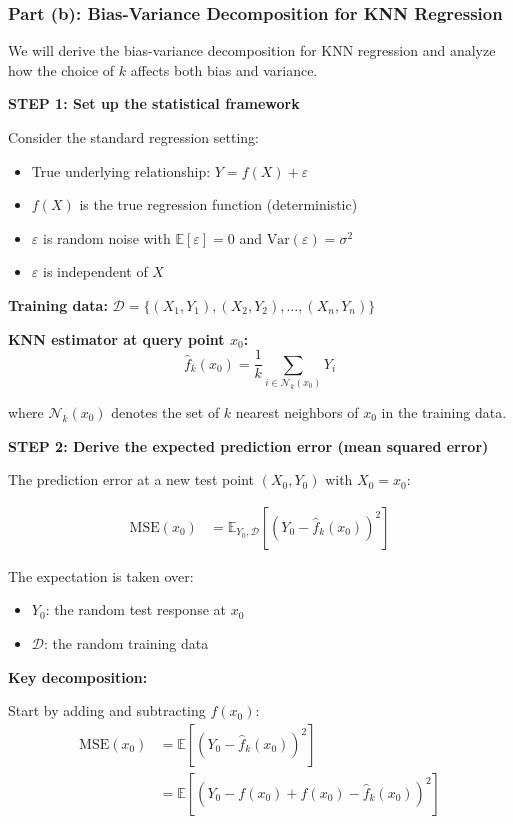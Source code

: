 \documentclass[12pt]{article}
\begin{document}
\newpage
\subsubsection{Part (b): Bias-Variance Decomposition for KNN Regression}

\begin{solution}
We will derive the bias-variance decomposition for KNN regression and analyze how the choice of \(k\) affects both bias and variance.

\textbf{STEP 1: Set up the statistical framework}

Consider the standard regression setting:
\begin{itemize}
    \item True underlying relationship: \(Y = f(X) + \varepsilon\)
    \item \(f(X)\) is the true regression function (deterministic)
    \item \(\varepsilon\) is random noise with \(\mathbb{E}[\varepsilon] = 0\) and \(\text{Var}(\varepsilon) = \sigma^2\)
    \item \(\varepsilon\) is independent of \(X\)
\end{itemize}

\textbf{Training data:} \(\mathcal{D} = \{(X_1, Y_1), (X_2, Y_2), \ldots, (X_n, Y_n)\}\)

\textbf{KNN estimator at query point \(x_0\):}
\[
\hat{f}_k(x_0) = \frac{1}{k} \sum_{i \in \mathcal{N}_k(x_0)} Y_i
\]

where \(\mathcal{N}_k(x_0)\) denotes the set of \(k\) nearest neighbors of \(x_0\) in the training data.

\textbf{STEP 2: Derive the expected prediction error (mean squared error)}

The prediction error at a new test point \((X_0, Y_0)\) with \(X_0 = x_0\):

\begin{align*}
\text{MSE}(x_0) &= \mathbb{E}_{Y_0, \mathcal{D}}[(Y_0 - \hat{f}_k(x_0))^2]
\end{align*}

The expectation is taken over:
\begin{itemize}
    \item \(Y_0\): the random test response at \(x_0\)
    \item \(\mathcal{D}\): the random training data
\end{itemize}

\textbf{Key decomposition:}

Start by adding and subtracting \(f(x_0)\):
\begin{align*}
\text{MSE}(x_0) &= \mathbb{E}[(Y_0 - \hat{f}_k(x_0))^2] \\
&= \mathbb{E}[(Y_0 - f(x_0) + f(x_0) - \hat{f}_k(x_0))^2]
\end{align*}


\end{solution}
\end{document}
